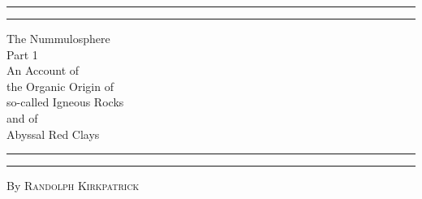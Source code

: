 \documentclass[a4paper, 12pt, oneside]{article}
\begin{document}
\begin{titlepage} %
	\centering %
	\scshape %

	
	\rule{\textwidth}{1.6pt}\vspace*{-\baselineskip}\vspace*{2pt} %
	\rule{\textwidth}{0.4pt} %
	
	\vspace{0.75\baselineskip} %

        {\Huge The Nummulosphere\\ Part 1\\ An Account of \\ the Organic Origin of\\ so-called Igneous Rocks\\ and of\\ Abyssal Red Clays \\} %
	
	\vspace{0.75\baselineskip} %
	
	\rule{\textwidth}{0.4pt}\vspace*{-\baselineskip}\vspace{3.2pt} %
	\rule{\textwidth}{1.6pt} %
	
	\vspace{1\baselineskip} %
	
	
	{By \scshape\Large Randolph Kirkpatrick\\} %
	
	\vspace*{1\baselineskip} %
	
	
	\vspace{1\baselineskip} %

	

\end{titlepage}
\end{document}

